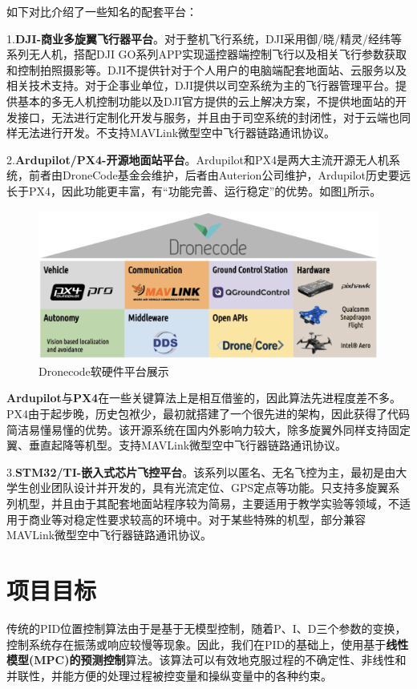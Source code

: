 如下对比介绍了一些知名的配套平台：

1.\textbf{DJI-商业多旋翼飞行器平台}。对于整机飞行系统，DJI采用御/晓/精灵/经纬等系列无人机，搭配DJI GO系列APP实现遥控器端控制飞行以及相关飞行参数获取和控制拍照摄影等。DJI不提供针对于个人用户的电脑端配套地面站、云服务以及相关技术支持。对于企事业单位，DJI提供以司空系统为主的飞行器管理平台。提供基本的多无人机控制功能以及DJI官方提供的云上解决方案，不提供地面站的开发接口，无法进行定制化开发与服务，并且由于司空系统的封闭性，对于云端也同样无法进行开发。不支持MAVLink微型空中飞行器链路通讯协议。

2.\textbf{Ardupilot/PX4-开源地面站平台}。Ardupilot和PX4是两大主流开源无人机系统，前者由DroneCode基金会维护，后者由Auterion公司维护，Ardupilot历史要远长于PX4，因此功能更丰富，有“功能完善、运行稳定”的优势。如图\ref{Fig:imgx}所示。

\begin{figure}[ht]
  \centering
  \includegraphics[width=0.8\linewidth]{./Figure/Dronecode_Software_Stack.png}
  \caption{Dronecode软硬件平台展示}\label{Fig:imgx}
\end{figure}

\textbf{Ardupilot}与\textbf{PX4}在一些关键算法上是相互借鉴的，因此算法先进程度差不多。PX4由于起步晚，历史包袱少，最初就搭建了一个很先进的架构，因此获得了代码简洁易懂易懂的优势。该开源系统在国内外影响力较大，除多旋翼外同样支持固定翼、垂直起降等机型。支持MAVLink微型空中飞行器链路通讯协议。

3.\textbf{STM32/TI-嵌入式芯片飞控平台}。该系列以匿名、无名飞控为主，最初是由大学生创业团队设计并开发的，具有光流定位、GPS定点等功能。只支持多旋翼系列机型，并且由于其配套地面站程序较为简易，主要适用于教学实验等领域，不适用于商业等对稳定性要求较高的环境中。对于某些特殊的机型，部分兼容MAVLink微型空中飞行器链路通讯协议。

\section{项目目标}

传统的PID位置控制算法由于是基于无模型控制，随着P、I、D三个参数的变换，控制系统存在振荡或响应较慢等现象。因此，我们在PID的基础上，使用基于\textbf{线性模型(MPC)的预测控制}算法。该算法可以有效地克服过程的不确定性、非线性和并联性，并能方便的处理过程被控变量和操纵变量中的各种约束。

